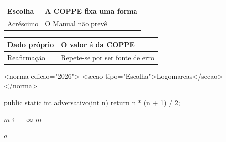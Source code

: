 \documentclass[dsc,pdfa,coorientador,dadoscoleta]{ufrj}
\begin{document}
  \begin{quadro}[ht]
    \centering\caption{Segundo quadro}\label{qua:adv2}
    \begin{tabular}{|l|l|}\hline Escolha & A COPPE fixa uma forma\\ \hline
      Acréscimo & O Manual não prevê\\ \hline\end{tabular}
  \end{quadro}
  \begin{quadro}[ht]
    \centering\caption{Terceiro quadro}\label{qua:adv3}
    \begin{tabular}{|l|l|}\hline Dado próprio & O valor é da COPPE\\ \hline
      Reafirmação & Repete-se por ser fonte de erro\\ \hline\end{tabular}
  \end{quadro}
  \begin{xml}[caption={Segundo programa, em XML},label=prog:adv2]
<norma edicao="2026">
  <secao tipo="Escolha">Logomarcas</secao>
</norma>
  \end{xml}
  \begin{java}[caption={Terceiro programa, em Java},label=prog:adv3]
public static int adversativo(int n) {
    return n * (n + 1) / 2;
}
  \end{java}
  \begin{algorithm}[H]
    \caption{Segundo algoritmo}\label{alg:adv2}
    $m \leftarrow -\infty$\;
    \Return $m$\;
  \end{algorithm}
  \begin{algorithm}[H]
    \caption{Terceiro algoritmo}\label{alg:adv3}
    \Return $a$\;
  \end{algorithm}
\end{document}
